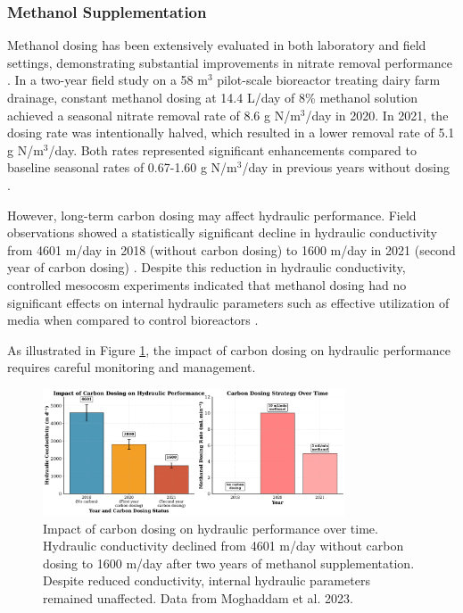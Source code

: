 \documentclass[12pt,a4paper]{article}
\begin{document}
\subsubsection{Methanol Supplementation}

Methanol dosing has been extensively evaluated in both laboratory and field settings, demonstrating substantial improvements in nitrate removal performance \citep{RN242}. In a two-year field study on a 58 m$^3$ pilot-scale bioreactor treating dairy farm drainage, constant methanol dosing at 14.4 L/day of 8\% methanol solution achieved a seasonal nitrate removal rate of 8.6 g N/m$^3$/day in 2020. In 2021, the dosing rate was intentionally halved, which resulted in a lower removal rate of 5.1 g N/m$^3$/day. Both rates represented significant enhancements compared to baseline seasonal rates of 0.67-1.60 g N/m$^3$/day in previous years without dosing \citep{RN242}.

However, long-term carbon dosing may affect hydraulic performance. Field observations showed a statistically significant decline in hydraulic conductivity from 4601 m/day in 2018 (without carbon dosing) to 1600 m/day in 2021 (second year of carbon dosing) \citep{RN242}. Despite this reduction in hydraulic conductivity, controlled mesocosm experiments indicated that methanol dosing had no significant effects on internal hydraulic parameters such as effective utilization of media when compared to control bioreactors \citep{RN242}.

As illustrated in Figure \ref{fig:hydraulic_performance}, the impact of carbon dosing on hydraulic performance requires careful monitoring and management.

\begin{figure}[ht]
\centering
\includegraphics[width=0.8\textwidth]{fig3_hydraulic_performance_scientific}
\caption{Impact of carbon dosing on hydraulic performance over time. Hydraulic conductivity declined from 4601 m/day without carbon dosing to 1600 m/day after two years of methanol supplementation. Despite reduced conductivity, internal hydraulic parameters remained unaffected. Data from Moghaddam et al. 2023.}
\label{fig:hydraulic_performance}
\end{figure}
\end{document}

